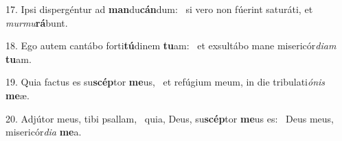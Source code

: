 17. Ipsi dispergéntur ad \textbf{man}du\textbf{cán}dum: \ast\  si vero non fúerint saturáti, et \textit{mur}\textit{mu}\textbf{rá}bunt.\

18. Ego autem cantábo forti\textbf{tú}dinem \textbf{tu}am: \ast\  et exsultábo mane misericór\textit{di}\textit{am} \textbf{tu}am.\

19. Quia factus es su\textbf{scép}tor \textbf{me}us, \ast\  et refúgium meum, in die tribulati\textit{ó}\textit{nis} \textbf{me}æ.\

20. Adjútor meus, tibi psallam, \dag\  quia, Deus, su\textbf{scép}tor \textbf{me}us es: \ast\  Deus meus, misericór\textit{di}\textit{a} \textbf{me}a.\

